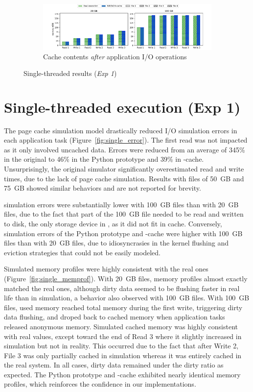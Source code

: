 \begin{figure}
    \begin{subfigure}{\linewidth}
        \centering
           \includegraphics[width=1.05\linewidth]{result/single/figures/cached_files.pdf}
           \caption{Cache contents \emph{after} application I/O operations}
           \label{fig:single_cache}
    \end{subfigure}
    \caption{Single-threaded results (\textit{Exp 1})}
\end{figure}

\section{Single-threaded execution (Exp 1)}

The page cache simulation model drastically reduced I/O simulation
errors in each application task (Figure~\ref{fig:single_error}). The first read was not impacted
as it only involved uncached data. Errors were reduced from an average
of 345\% in the original \wrench to 46\% in the Python prototype and
39\% in \wrench-cache. Unsurprisingly, the original \wrench simulator
significantly overestimated read and write times, due to the lack
of page cache simulation. Results with files of 50~GB and 75~GB
showed similar behaviors and are not reported for brevity.

\wrench simulation errors were substantially lower with 100~GB
files than with 20~GB files, due to the fact that part of the
100~GB file needed to be read and written to disk, the only storage
device in \wrench, as it did not fit in cache. Conversely,
simulation errors of the Python prototype and \wrench-cache were higher with
100~GB files than with 20~GB files, due to idiosyncrasies in the kernel
flushing and eviction strategies that could not be easily modeled.

Simulated memory profiles were highly consistent with the real ones
(Figure~\ref{fig:single_memprof}). With 20~GB files, memory profiles almost exactly matched the
real ones, although dirty data seemed to be flushing faster in real
life than in simulation, a behavior also
observed with 100~GB files. With 100~GB files, used memory reached
total memory during the first write, triggering dirty data
flushing, and droped back to cached memory when application tasks
released anonymous memory. Simulated cached memory was highly
consistent with real values, except toward the end of Read 3 where
it slightly increased in simulation but not in reality. This
occurred due to the fact that after Write 2, File 3 was only partially
cached in simulation whereas it was entirely cached in the real
system. In all cases, dirty data remained under the dirty ratio as
expected. The Python prototype and \wrench-cache exhibited nearly
identical memory profiles, which reinforces the confidence in our
implementations.

